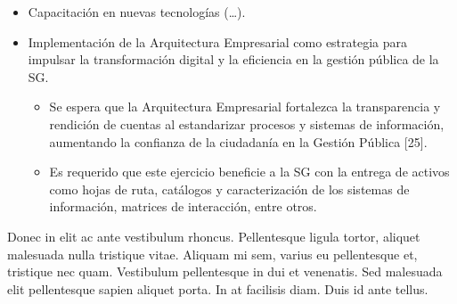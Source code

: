 \documentclass[
	a4paper, %
	12pt, %
]{include/CSSullivanBusinessReport}
\def\tightlist{}
\begin{document}
\begin{itemize}
  \begin{itemize}
  \tightlist
  \item
    Se busca la consolidación de herramientas, canales e información
    para fortalecer la oferta y celeridad de servicios y la
    participación ciudadana {[}11{]}. Esto incluye el seguimiento a
    canales de atención virtual como SuperCADE Virtual, chat, chat-Bot y
    videollamadas de la línea 195 {[}11{]}.
  \item
    Se busca optimizar los procesos de recolección, análisis y
    divulgación de la información mediante la implementación de sistemas
    de información que contengan la automatización de la recolección de
    datos y el uso de herramientas analíticas {[}15{]}.
  \item
    Una noticia reciente destaca que el Distrito unifica en el portal
    Bogotá su oferta de trámites y servicios, el cual permite acceder a
    más de 1.400 trámites y servicios y realizar pagos en línea (no
    tributarios) y agendamiento de citas en la RedCADE desde casa
    {[}40{]}. Esto representa una mejora significativa en la
    accesibilidad y eficiencia de los servicios digitales para la
    ciudadanía.
  \end{itemize}
\item
  Capacitación en nuevas tecnologías (\ldots).
\item
  Implementación de la Arquitectura Empresarial como estrategia para
  impulsar la transformación digital y la eficiencia en la gestión
  pública de la SG.

  \begin{itemize}
  \tightlist
  \item
    Se espera que la Arquitectura Empresarial fortalezca la
    transparencia y rendición de cuentas al estandarizar procesos y
    sistemas de información, aumentando la confianza de la ciudadanía en
    la Gestión Pública {[}25{]}.
  \item
    Es requerido que este ejercicio beneficie a la SG con la entrega de
    activos como hojas de ruta, catálogos y caracterización de los
    sistemas de información, matrices de interacción, entre otros.
  \end{itemize}
\end{itemize}

Donec in elit ac ante vestibulum rhoncus. Pellentesque ligula tortor, aliquet malesuada nulla tristique vitae. Aliquam mi sem, varius eu pellentesque et, tristique nec quam. Vestibulum pellentesque in dui et venenatis. Sed malesuada elit pellentesque sapien aliquet porta. In at facilisis diam. Duis id ante tellus. %
\end{document}
